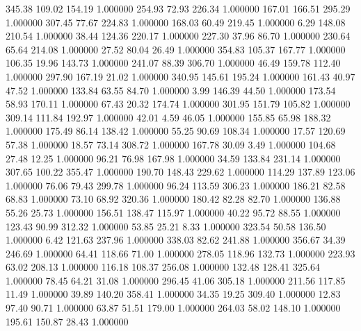     345.38    109.02    154.19  1.000000
    254.93     72.93    226.34  1.000000
    167.01    166.51    295.29  1.000000
    307.45     77.67    224.83  1.000000
    168.03     60.49    219.45  1.000000
      6.29    148.08    210.54  1.000000
     38.44    124.36    220.17  1.000000
    227.30     37.96     86.70  1.000000
    230.64     65.64    214.08  1.000000
     27.52     80.04     26.49  1.000000
    354.83    105.37    167.77  1.000000
    106.35     19.96    143.73  1.000000
    241.07     88.39    306.70  1.000000
     46.49    159.78    112.40  1.000000
    297.90    167.19     21.02  1.000000
    340.95    145.61    195.24  1.000000
    161.43     40.97     47.52  1.000000
    133.84     63.55     84.70  1.000000
      3.99    146.39     44.50  1.000000
    173.54     58.93    170.11  1.000000
     67.43     20.32    174.74  1.000000
    301.95    151.79    105.82  1.000000
    309.14    111.84    192.97  1.000000
     42.01      4.59     46.05  1.000000
    155.85     65.98    188.32  1.000000
    175.49     86.14    138.42  1.000000
     55.25     90.69    108.34  1.000000
     17.57    120.69     57.38  1.000000
     18.57     73.14    308.72  1.000000
    167.78     30.09      3.49  1.000000
    104.68     27.48     12.25  1.000000
     96.21     76.98    167.98  1.000000
     34.59    133.84    231.14  1.000000
    307.65    100.22    355.47  1.000000
    190.70    148.43    229.62  1.000000
    114.29    137.89    123.06  1.000000
     76.06     79.43    299.78  1.000000
     96.24    113.59    306.23  1.000000
    186.21     82.58     68.83  1.000000
     73.10     68.92    320.36  1.000000
    180.42     82.28     82.70  1.000000
    136.88     55.26     25.73  1.000000
    156.51    138.47    115.97  1.000000
     40.22     95.72     88.55  1.000000
    123.43     90.99    312.32  1.000000
     53.85     25.21      8.33  1.000000
    323.54     50.58    136.50  1.000000
      6.42    121.63    237.96  1.000000
    338.03     82.62    241.88  1.000000
    356.67     34.39    246.69  1.000000
     64.41    118.66     71.00  1.000000
    278.05    118.96    132.73  1.000000
    223.93     63.02    208.13  1.000000
    116.18    108.37    256.08  1.000000
    132.48    128.41    325.64  1.000000
     78.45     64.21     31.08  1.000000
    296.45     41.06    305.18  1.000000
    211.56    117.85     11.49  1.000000
     39.89    140.20    358.41  1.000000
     34.35     19.25    309.40  1.000000
     12.83     97.40     90.71  1.000000
     63.87     51.51    179.00  1.000000
    264.03     58.02    148.10  1.000000
    195.61    150.87     28.43  1.000000
